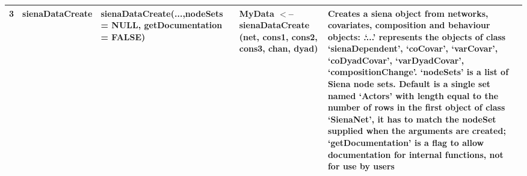 \documentclass[a4paper,fleqn,11pt]{article}
\newcommand{\+}{\, + \,}
\begin{document}
\begin{landscape}
\begin{small}
\begin{longtable}{c | p{3.8cm} | p{4.5cm} | p{4.0cm} | p{7.4cm} }

3 & sienaDataCreate & sienaDataCreate(...,\newline nodeSets = NULL, \newline
getDocumentation = FALSE) &
MyData $<$-- \newline
sienaDataCreate (net, \newline cons1, cons2, cons3, \newline
chan, dyad) & Creates a siena object from networks, covariates,
composition and behaviour objects: .`...'  represents the objects of class
`sienaDependent', `coCovar', `varCovar', `coDyadCovar', `varDyadCovar',
`compositionChange'. `nodeSets' is a list of Siena node sets. Default is a
single set named `Actors' with length equal to the number of rows in the
first object of class `SienaNet', it has to match the nodeSet supplied when
the arguments are created; `getDocumentation' is a flag to allow
documentation for internal functions,  not for use by users\\
\hline



\end{longtable}
\end{small}
\end{landscape}
\end{document}
